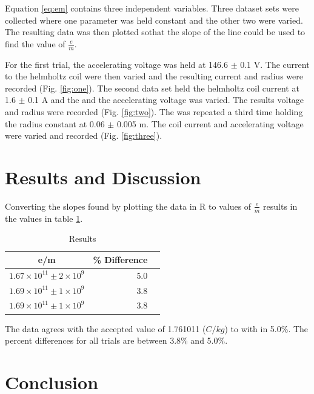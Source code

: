 \documentclass[twocolumn,secnumarabic,amssymb, nobibnotes, aps, pra]{revtex4}
\begin{document}
Equation \ref{eq:em} contains three independent variables.  Three dataset sets were collected where one parameter was held constant and the other two were varied.  The resulting data was then plotted sothat the slope of the line could be used to find the value of $\frac{e}{m}$.  

For the first trial, the accelerating voltage was held at 146.6 $\pm$ 0.1 V. The current to the helmholtz coil were then varied and the resulting current and radius were recorded (Fig. \ref{fig:one}).  The second data set held the helmholtz coil current at 1.6 $\pm$ 0.1 A and the and the accelerating voltage was varied.  The results voltage and radius were recorded (Fig. \ref{fig:two}).  The was repeated a third time holding the radius constant at 0.06 $\pm$ 0.005 m.  The coil current and accelerating voltage were varied and recorded (Fig. \ref{fig:three}).  



\section{Results and Discussion}

Converting the slopes found by plotting the data in R to values of $\frac{e}{m}$ results in the values in table \ref{tab:tuning}.

\begin{table} [h]  %
\caption{Results}      %
\centering              %
\begin{tabular}{crr} %
\hline\hline %
  e/m & \% Difference   \\
\hline %
$1.67 \times 10^11 \pm 2 \times 10^9$ & 5.0   \\
$1.69 \times 10^11 \pm 1 \times 10^9$ & 3.8   \\
$1.69 \times 10^11 \pm 1 \times 10^9$ & 3.8   \\
\hline %
\end{tabular}
\label{tab:tuning}
\end{table}


The data agrees with the accepted value of 1.761011 ($C/kg$) to with in 5.0\%.  The percent differences for all trials are between 3.8\% and 5.0\%.

\section{Conclusion}
\end{document}
